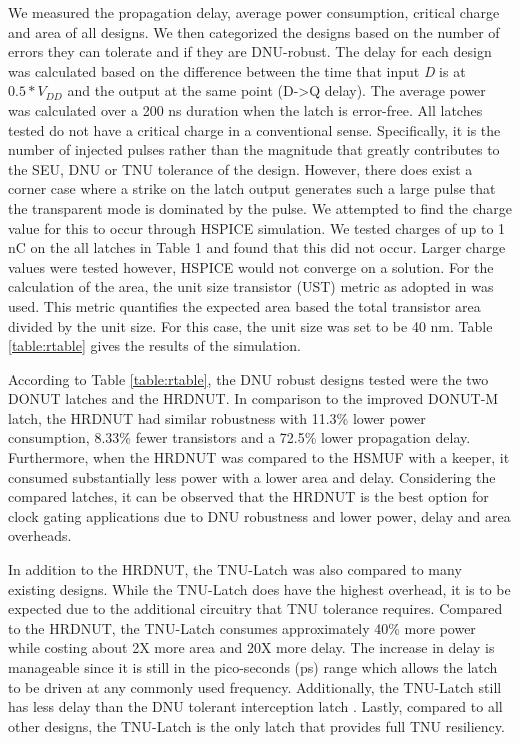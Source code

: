 We measured the propagation delay, average power consumption, critical charge and area of all designs. We then categorized the designs based on the number of errors they can tolerate and if they are DNU-robust. The delay for each design was calculated based on the difference between the time that input \textit{D} is at $0.5*V_{DD}$ and the output at the same point (D-\textgreater Q delay). The average power was calculated over a 200 ns duration when the latch is error-free. All latches tested do not have a critical charge in a conventional sense. Specifically, it is the number of injected pulses rather than the magnitude that greatly contributes to the SEU, DNU or TNU tolerance of the design. However, there does exist a corner case where a strike on the latch output generates such a large pulse that the transparent mode is dominated by the pulse. We attempted to find the charge value for this to occur through HSPICE simulation. We tested charges of up to 1 nC on the all latches in Table 1 and found that this did not occur. Larger charge values were tested however, HSPICE would not converge on a solution. For the calculation of the area, the unit size transistor (UST) metric as adopted in \cite{DNCS} was used. This metric quantifies the expected area based the total transistor area divided by the unit size. For this case, the unit size was set to be 40 nm. Table \ref{table:rtable} gives the results of the simulation.

According to Table \ref{table:rtable}, the DNU robust designs tested were the two DONUT latches and the HRDNUT. In comparison to the improved DONUT-M latch, the HRDNUT had similar robustness with 11.3\% lower power consumption, 8.33\% fewer transistors and a 72.5\% lower propagation delay. Furthermore, when the HRDNUT was compared to the HSMUF with a keeper, it consumed substantially less power with a lower area and delay. Considering the compared latches, it can be observed that the HRDNUT is the best option for clock gating applications due to DNU robustness and lower power, delay and area overheads.

In addition to the HRDNUT, the TNU-Latch was also compared to many existing designs. While the TNU-Latch does have the highest overhead, it is to be expected due to the additional circuitry that TNU tolerance requires. Compared to the HRDNUT, the TNU-Latch consumes approximately 40\% more power while costing about 2X more area and 20X more delay. The increase in delay is manageable since it is still in the pico-seconds (ps) range which allows the latch to be driven at any commonly used frequency. Additionally, the TNU-Latch still has less delay than the DNU tolerant interception latch \cite{Inter}. Lastly, compared to all other designs, the TNU-Latch is the only latch that provides full TNU resiliency.